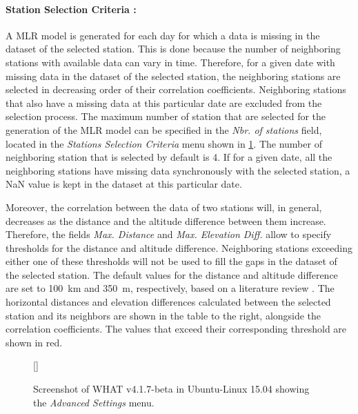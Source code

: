 \documentclass[WHATMANUAL.tex]{subfiles}
\begin{document}
\paragraph{Station Selection Criteria :} A MLR model is generated for each day for which a data is missing in the dataset of the selected station. This is done because the number of neighboring stations with available data can vary in time. Therefore, for a given date with missing data in the dataset of the selected station, the neighboring stations are selected in decreasing order of their correlation coefficients. Neighboring stations that also have a missing data at this particular date are excluded from the selection process. The maximum number of station that are selected for the generation of the MLR model can be specified in the \emph{Nbr. of stations} field, located in the \emph{Stations Selection Criteria} menu shown in \cref{fig:selection_criteria}. The number of neighboring station that is selected by default is 4. If for a given date, all the neighboring stations have missing data synchronously with the selected station, a NaN value is kept in the dataset at this particular date. 

Moreover, the correlation between the data of two stations will, in general, decreases as the distance and the altitude difference between them increase. Therefore, the fields \emph{Max. Distance} and \emph{Max. Elevation Diff.} allow to specify thresholds for the distance and altitude difference. Neighboring stations exceeding either one of these thresholds will not be used to fill the gaps in the dataset of the selected station. The default values for the distance and altitude difference are set to \SI{100}{km} and \SI{350}{m}, respectively, based on a literature review \citep{tronci_comparison_1986,xia_forest_1999,simolo_improving_2010}. The horizontal distances and elevation differences calculated between the selected station and its neighbors are shown in the table to the right, alongside the correlation coefficients. The values that exceed their corresponding threshold are shown in red.

\begin{figure}[!hb]
    \setlength{\fboxsep}{0pt}
    [\FBwidth]
	{
	 \caption{Screenshot of WHAT v4.1.7-beta in Ubuntu-Linux 15.04 showing the \emph{Advanced Settings} menu.}
	 \label{fig:selection_criteria}
	}
	{
	}
\end{figure}
\end{document}
